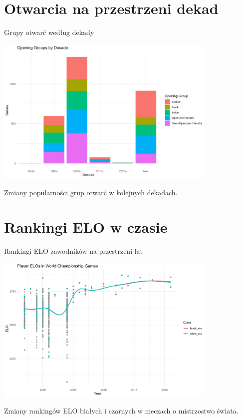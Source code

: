 \documentclass{beamer}
\begin{document}
\section{Otwarcia na przestrzeni dekad}
\begin{frame}{Grupy otwarć według dekady}
  \begin{center}
    \includegraphics[width=0.8\textwidth]{../../ChessPlots/openings_by_decade.png}
  \end{center}
  \small
  Zmiany popularności grup otwarć w kolejnych dekadach.
\end{frame}

\section{Rankingi ELO w czasie}
\begin{frame}{Rankingi ELO zawodników na przestrzeni lat}
  \begin{center}
    \includegraphics[width=0.8\textwidth]{../../ChessPlots/elos_over_time.png}
  \end{center}
  \small
  Zmiany rankingów ELO białych i czarnych w meczach o mistrzostwo świata.
\end{frame}
\end{document}
